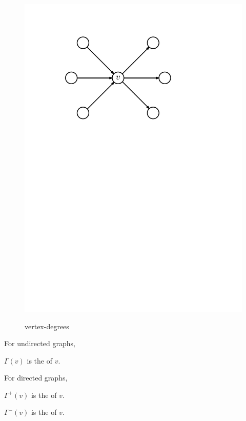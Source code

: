 \begin{figure}[htb]
{	\includegraphics[scale=.5]{01_graph_theory/pics/directed-graph_indegree-outdegree.pdf}
}
\caption{vertex-degrees}
\end{figure}
\FloatBarrier

\begin{definition}
For undirected graphs,
\begin{compactitem}
\item $\Gamma(v)$ is the  of $v$.
\end{compactitem}
For directed graphs,
\begin{compactitem}
\item $\Gamma^{+}(v)$ is the  of $v$.
\item $\Gamma^{-}(v)$ is the  of $v$.
\end{compactitem}
\end{definition}

